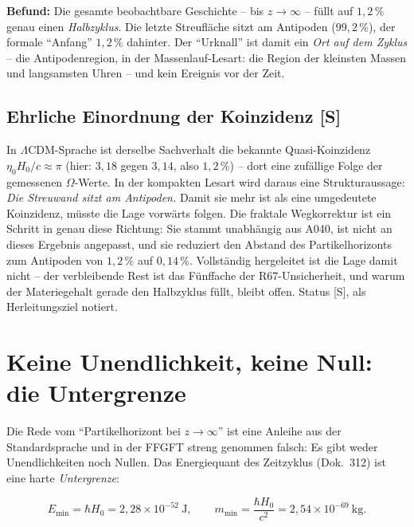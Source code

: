 \textbf{Befund:} Die gesamte beobachtbare Geschichte -- bis
$z \to \infty$ -- füllt auf $1{,}2\,\%$ genau einen
\emph{Halbzyklus}. Die letzte Streufläche sitzt am Antipoden
($99{,}2\,\%$), der formale \enquote{Anfang} $1{,}2\,\%$ dahinter.
Der \enquote{Urknall} ist damit ein \emph{Ort auf dem Zyklus} --
die Antipodenregion, in der Massenlauf-Lesart: die Region der
kleinsten Massen und langsamsten Uhren -- und kein Ereignis vor
der Zeit.

\section{Ehrliche Einordnung der Koinzidenz [S]}

In $\Lambda$CDM-Sprache ist derselbe Sachverhalt die bekannte
Quasi-Koinzidenz $\eta_0 H_0/c \approx \pi$ (hier: $3{,}18$ gegen
$3{,}14$, also $1{,}2\,\%$) -- dort eine zufällige Folge der
gemessenen $\Omega$-Werte. In der kompakten Lesart wird daraus
eine Strukturaussage: \emph{Die Streuwand sitzt am Antipoden.}
Damit sie mehr ist als eine umgedeutete Koinzidenz, müsste die
Lage vorwärts folgen. Die fraktale Wegkorrektur ist ein Schritt in
genau diese Richtung: Sie stammt unabhängig aus A040, ist nicht
an dieses Ergebnis angepasst, und sie reduziert den Abstand des
Partikelhorizonts zum Antipoden von $1{,}2\,\%$ auf
$0{,}14\,\%$. Vollständig hergeleitet ist die Lage damit nicht --
der verbleibende Rest ist das Fünffache der R67-Unsicherheit, und
warum der Materiegehalt gerade den Halbzyklus füllt, bleibt offen.
Status [S], als Herleitungsziel notiert.

\chapter{Keine Unendlichkeit, keine Null: die Untergrenze}

Die Rede vom \enquote{Partikelhorizont bei $z\to\infty$} ist eine
Anleihe aus der Standardsprache und in der FFGFT streng genommen
falsch: Es gibt weder Unendlichkeiten noch Nullen. Das
Energiequant des Zeitzyklus (Dok.~312) ist eine harte
\emph{Untergrenze}:

\begin{equation}
  E_\text{min} = \hbar H_0 = 2{,}28\times10^{-52}~\text{J},
  \qquad
  m_\text{min} = \frac{\hbar H_0}{c^2}
  = 2{,}54\times10^{-69}~\text{kg}.
\end{equation}


